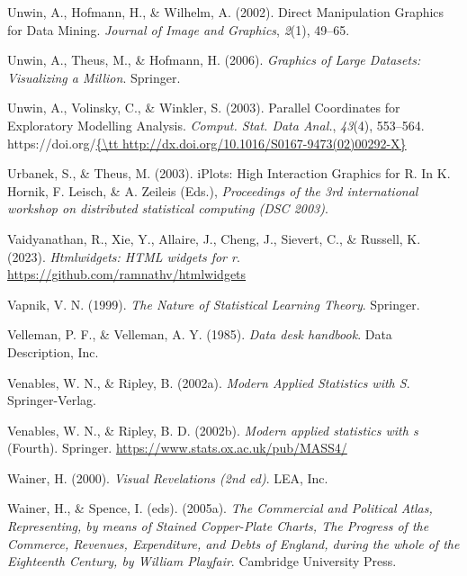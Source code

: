 \documentclass[
  letterpaper,
]{book}
\newlength{\cslhangindent}
\newlength{\cslentryspacingunit} %
\newenvironment{CSLReferences}[2] %
 {%
  \setlength{\parindent}{0pt}
  \ifodd #1
  \let\oldpar\par
  \def\par{\hangindent=\cslhangindent\oldpar}
  \fi
  \setlength{\parskip}{#2\cslentryspacingunit}
 }%
 {}
\begin{document}
\begin{CSLReferences}{1}{0}
\leavevmode{}%
Unwin, A., Hofmann, H., \& Wilhelm, A. (2002). Direct {M}anipulation
{G}raphics for {D}ata {M}ining. \emph{Journal of Image and Graphics},
\emph{2}(1), 49--65.

\leavevmode{}%
Unwin, A., Theus, M., \& Hofmann, H. (2006). \emph{Graphics of {L}arge
{D}atasets: {V}isualizing a {M}illion}. Springer.

\leavevmode{}%
Unwin, A., Volinsky, C., \& Winkler, S. (2003). Parallel {C}oordinates
for {E}xploratory {M}odelling {A}nalysis. \emph{Comput. Stat. Data
Anal.}, \emph{43}(4), 553--564.
https://doi.org/\href{\%7B/tt\%20http://dx.doi.org/10.1016/S0167-9473(02)00292-X\%7D}{\{\textbackslash tt
http://dx.doi.org/10.1016/S0167-9473(02)00292-X\}}

\leavevmode{}%
Urbanek, S., \& Theus, M. (2003). {iPlots}: {H}igh {I}nteraction
{G}raphics for {R}. In K. Hornik, F. Leisch, \& A. Zeileis (Eds.),
\emph{Proceedings of the 3rd international workshop on distributed
statistical computing (DSC 2003)}.

\leavevmode{}%
Vaidyanathan, R., Xie, Y., Allaire, J., Cheng, J., Sievert, C., \&
Russell, K. (2023). \emph{Htmlwidgets: HTML widgets for r}.
\url{https://github.com/ramnathv/htmlwidgets}

\leavevmode{}%
Vapnik, V. N. (1999). \emph{The {N}ature of {S}tatistical {L}earning
{T}heory}. Springer.

\leavevmode{}%
Velleman, P. F., \& Velleman, A. Y. (1985). \emph{Data desk handbook}.
Data Description, Inc.

\leavevmode{}%
Venables, W. N., \& Ripley, B. (2002a). \emph{Modern {A}pplied
{S}tatistics with {S}}. Springer-Verlag.

\leavevmode{}%
Venables, W. N., \& Ripley, B. D. (2002b). \emph{Modern applied
statistics with s} (Fourth). Springer.
\url{https://www.stats.ox.ac.uk/pub/MASS4/}

\leavevmode{}%
Wainer, H. (2000). \emph{Visual {R}evelations (2nd ed)}. LEA, Inc.

\leavevmode{}%
Wainer, H., \& Spence, I. (eds). (2005a). \emph{The {C}ommercial and
{P}olitical {A}tlas, {R}epresenting, by means of {S}tained
{C}opper-{P}late {C}harts, {T}he {P}rogress of the {C}ommerce,
{R}evenues, {E}xpenditure, and {D}ebts of {E}ngland, during the whole of
the {E}ighteenth {C}entury, by {W}illiam {P}layfair}. Cambridge
University Press.


\end{CSLReferences}
\end{document}
